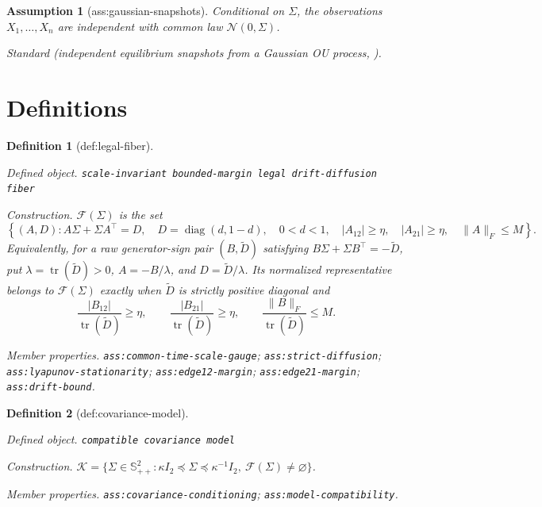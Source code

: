 \documentclass{article}
\newtheorem{assumption}{Assumption}
\newtheorem{definition}{Definition}
\begin{document}
\begin{assumption}[ass:gaussian-snapshots]\label{ass:gaussian-snapshots}
Conditional on \(\Sigma\), the observations \(X_1,\ldots,X_n\) are independent with common law \(\mathcal N(0,\Sigma)\).
\par\smallskip\noindent\emph{Standard} (independent equilibrium snapshots from a Gaussian OU process, \cite{VarandoHansen2020}).
\end{assumption}

\section{Definitions}

\begin{definition}[def:legal-fiber]\label{def:legal-fiber}
\par\smallskip\noindent\emph{Defined object.} \texttt{scale-\allowbreak{}invariant bounded-\allowbreak{}margin legal drift-\allowbreak{}diffusion fiber}
\par\smallskip\noindent\emph{Construction.} \(\mathcal F(\Sigma)\) is the set
\[
\left\{(A,D):A\Sigma+\Sigma A^{\top}=D,\quad D=\operatorname{diag}(d,1-d),\quad 0<d<1,\quad |A_{12}|\ge\eta,\quad |A_{21}|\ge\eta,\quad \lVert A\rVert_F\le M\right\}.
\]
Equivalently, for a raw generator-sign pair \((B,\widetilde D)\) satisfying \(B\Sigma+\Sigma B^{\top}=-\widetilde D\), put \(\lambda=\operatorname{tr}(\widetilde D)>0\), \(A=-B/\lambda\), and \(D=\widetilde D/\lambda\). Its normalized representative belongs to \(\mathcal F(\Sigma)\) exactly when \(\widetilde D\) is strictly positive diagonal and
\[
\frac{|B_{12}|}{\operatorname{tr}(\widetilde D)}\ge\eta,\qquad
\frac{|B_{21}|}{\operatorname{tr}(\widetilde D)}\ge\eta,\qquad
\frac{\lVert B\rVert_F}{\operatorname{tr}(\widetilde D)}\le M.
\]
\par\smallskip\noindent\emph{Member properties.} \texttt{ass:\allowbreak{}common-\allowbreak{}time-\allowbreak{}scale-\allowbreak{}gauge}; \texttt{ass:\allowbreak{}strict-\allowbreak{}diffusion}; \texttt{ass:\allowbreak{}lyapunov-\allowbreak{}stationarity}; \texttt{ass:\allowbreak{}edge12-\allowbreak{}margin}; \texttt{ass:\allowbreak{}edge21-\allowbreak{}margin}; \texttt{ass:\allowbreak{}drift-\allowbreak{}bound}.
\end{definition}

\begin{definition}[def:covariance-model]\label{def:covariance-model}
\par\smallskip\noindent\emph{Defined object.} \texttt{compatible covariance model}
\par\smallskip\noindent\emph{Construction.} \(\mathcal K=\{\Sigma\in\mathbb S_{++}^{2}:\kappa I_2\preceq\Sigma\preceq\kappa^{-1}I_2,\ \mathcal F(\Sigma)\ne\varnothing\}\).
\par\smallskip\noindent\emph{Member properties.} \texttt{ass:\allowbreak{}covariance-\allowbreak{}conditioning}; \texttt{ass:\allowbreak{}model-\allowbreak{}compatibility}.
\end{definition}
\end{document}
